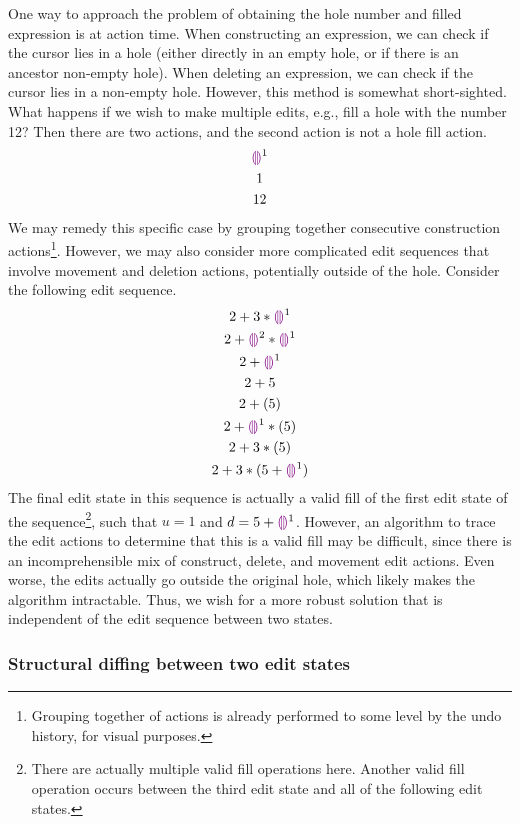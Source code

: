 One way to approach the problem of obtaining the hole number and filled expression is at action time. When constructing an expression, we can check if the cursor lies in a hole (either directly in an empty hole, or if there is an ancestor non-empty hole). When deleting an expression, we can check if the cursor lies in a non-empty hole. However, this method is somewhat short-sighted. What happens if we wish to make multiple edits, e.g., fill a hole with the number 12? Then there are two actions, and the second action is not a hole fill action.
\begin{gather*}
  \textcolor{violet}{\llparenthesis}\textcolor{violet}{\rrparenthesis}^1 \\
  1 \\
  12
\end{gather*}
We may remedy this specific case by grouping together consecutive construction actions\footnote{Grouping together of actions is already performed to some level by the undo history, for visual purposes.}. However, we may also consider more complicated edit sequences that involve movement and deletion actions, potentially outside of the hole. Consider the following edit sequence.
\begin{gather*}
  2+3*\textcolor{violet}{\llparenthesis}\textcolor{violet}{\rrparenthesis}^1 \\
  2+\textcolor{violet}{\llparenthesis}\textcolor{violet}{\rrparenthesis}^2*\textcolor{violet}{\llparenthesis}\textcolor{violet}{\rrparenthesis}^1\\
  2+\textcolor{violet}{\llparenthesis}\textcolor{violet}{\rrparenthesis}^1\\
  2+5 \\
  2+(5) \\
  2+\textcolor{violet}{\llparenthesis}\textcolor{violet}{\rrparenthesis}^1*(5) \\
  2+3*(5) \\
  2+3*(5+\textcolor{violet}{\llparenthesis}\textcolor{violet}{\rrparenthesis}^1)
\end{gather*}
The final edit state in this sequence is actually a valid fill of the first edit state of the sequence\footnote{There are actually multiple valid fill operations here. Another valid fill operation occurs between the third edit state and all of the following edit states.}, such that $u=1$ and $d=5+\textcolor{violet}{\llparenthesis}\textcolor{violet}{\rrparenthesis}^1$. However, an algorithm to trace the edit actions to determine that this is a valid fill may be difficult, since there is an incomprehensible mix of construct, delete, and movement edit actions. Even worse, the edits actually go outside the original hole, which likely makes the algorithm intractable. Thus, we wish for a more robust solution that is independent of the edit sequence between two states.

\subsubsection{Structural diffing between two edit states}
\label{sec:far-detect-structural-diff}

